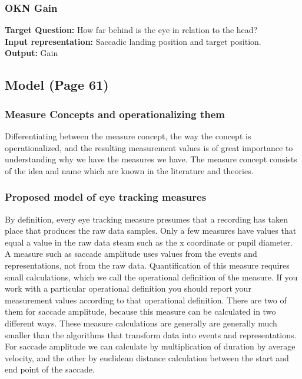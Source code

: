 \documentclass[12pt]{article}
\theoremstyle{definition}
\begin{document}
\subsubsection{OKN Gain}
\textbf{Target Question:} How far behind is the eye in relation to the head?\\
\textbf{Input representation:} Saccadic landing position and target position.\\
\textbf{Output:} Gain \\




\newpage
\subsection{Model (Page 61)}
\subsubsection{Measure Concepts and operationalizing them}
Differentiating between the measure concept, the way the concept is operationalized, and the resulting measurement values is of great importance to understanding why we have the measures we have. The measure concept consists of the idea and name which are known in the literature and theories.

\subsubsection{Proposed model of eye tracking measures}
By definition, every eye tracking measure presumes that a recording has taken place that produces the raw data samples. Only a few measures have values that equal a value in the raw data steam such as the x coordinate or pupil diameter.\\

A measure such as saccade amplitude uses values from the events and representations, not from the raw data. Quantification of this measure requires small calculations, which we call the operational definition of the measure. If you work with a particular operational definition you should report your measurement values according to that operational definition. There are two of them for saccade amplitude, because this measure can be calculated in two different ways. These measure calculations are generally are generally much smaller than the algorithms that transform data into events and representations.\\

For saccade amplitude we can calculate by multiplication of duration by average velocity, and the other by euclidean distance calculation between the start and end point of the saccade.\\
\end{document}
